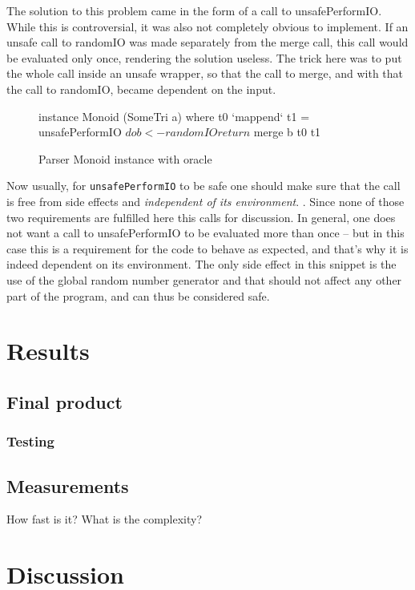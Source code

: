 \documentclass[a4paper,12pt,twosided]{report}
\begin{document}
The solution to this problem came in the form of a call to unsafePerformIO.
While this is controversial, it was also not completely obvious to implement. If
an unsafe call to randomIO was made separately from the merge call, this call
would be evaluated only once, rendering the solution useless. The trick here was
to put the whole call inside an unsafe wrapper, so that the call to merge, and
with that the call to randomIO, became dependent on the input.

\begin{figure}[H]
\begin{code}
instance Monoid (SomeTri a) where
    t0 `mappend` t1 = unsafePerformIO $ do
      b <- randomIO
      return $ merge b t0 t1
\end{code}
\caption{Parser Monoid instance with oracle}
\end{figure}

Now usually, for \texttt{unsafePerformIO} to be safe one should make sure that
the call is free from side effects and \textit{independent of its environment}.
\cite{unsafeHackage}. Since none of those two requirements are fulfilled here
this calls for discussion. In general, one does not want a call to
unsafePerformIO to be evaluated more than once -- but in this case this is a
requirement for the code to behave as expected, and that's why it is indeed
dependent on its environment. The only side effect in this snippet is the use of
the global random number generator and that should not affect any other part of
the program, and can thus be considered safe.

%
%

\chapter{Results}

\section{Final product}
\subsection{Testing}

\section{Measurements}
How fast is it? What is the complexity?

%
%
\chapter{Discussion}
\end{document}
